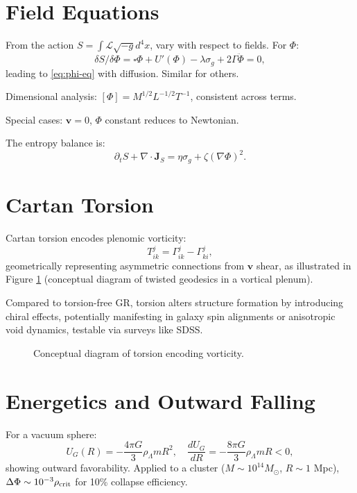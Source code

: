 \documentclass[11pt]{article}
\theoremstyle{plain}
\theoremstyle{definition}
\begin{document}
\section{Field Equations}
From the action $S = \int \mathcal{L} \sqrt{-g} d^4x$, vary with respect to fields. For $\Phi$:
\[
\delta S / \delta \Phi = \square \Phi + U'(\Phi) - \lambda \sigma_g + 2\Gamma \ddot{\Phi} = 0,
\]
leading to \eqref{eq:phi-eq} with diffusion. Similar for others.

Dimensional analysis: $[\Phi] = M^{1/2} L^{-1/2} T^{-1}$, consistent across terms.

Special cases: $\bm{v} = 0$, $\Phi$ constant reduces to Newtonian.

The entropy balance is:
\begin{equation}
\partial_t S + \nabla \cdot \bm{J}_S = \eta \sigma_g + \zeta (\nabla \Phi)^2.
\end{equation}

\section{Cartan Torsion}
Cartan torsion encodes plenomic vorticity:
\begin{equation}
T^j_{ik} = \Gamma^j_{ik} - \Gamma^j_{ki},
\end{equation}
geometrically representing asymmetric connections from $\bm{v}$ shear, as illustrated in Figure \ref{fig:torsion} (conceptual diagram of twisted geodesics in a vortical plenum).

Compared to torsion-free GR, torsion alters structure formation by introducing chiral effects, potentially manifesting in galaxy spin alignments or anisotropic void dynamics, testable via surveys like SDSS.

\begin{figure}[ht]
\centering
{}
\caption{Conceptual diagram of torsion encoding vorticity.}
\label{fig:torsion}
\end{figure}

\section{Energetics and Outward Falling}
For a vacuum sphere:
\begin{equation}
U_G(R) = -\frac{4\pi G}{3} \rho_\Lambda m R^2, \quad \frac{dU_G}{dR} = -\frac{8\pi G}{3} \rho_\Lambda m R < 0,
\end{equation}
showing outward favorability. Applied to a cluster ($M \sim 10^{14} M_\odot$, $R \sim 1$ Mpc), $\Delta \Phi \sim 10^{-3} \rho_{\rm crit}$ for 10\% collapse efficiency.
\end{document}
